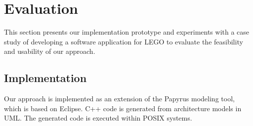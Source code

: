 \section{Evaluation}
\label{sec:evaluation}
This section presents our implementation prototype and experiments with a case study of developing a software application for LEGO to evaluate the feasibility and usability of our approach.

\subsection{Implementation}
Our approach is implemented as an extension of the Papyrus modeling tool, which is based on Eclipse.
C++ code is generated from architecture models in UML.
The generated code is executed within POSIX systems.

